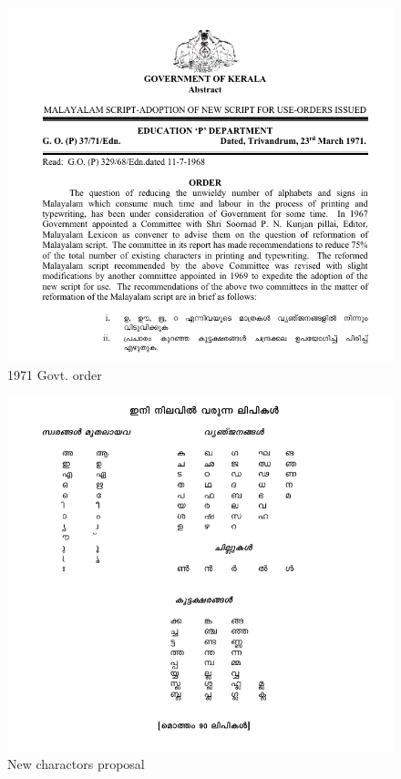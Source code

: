 \documentclass[10pt]{article}
\begin{document}
\begin{figure}[h]
  \centering
   \includegraphics[width=1.0\textwidth]{images/1971-gov-script-reformation-order.png}
     \caption{1971 Govt. order}
\end{figure}

\begin{figure}
  \centering
   \includegraphics[width=1.0\textwidth]{images/1971-new-lipi.png}
  \caption{New charactors proposal}
\end{figure}
\end{document}
